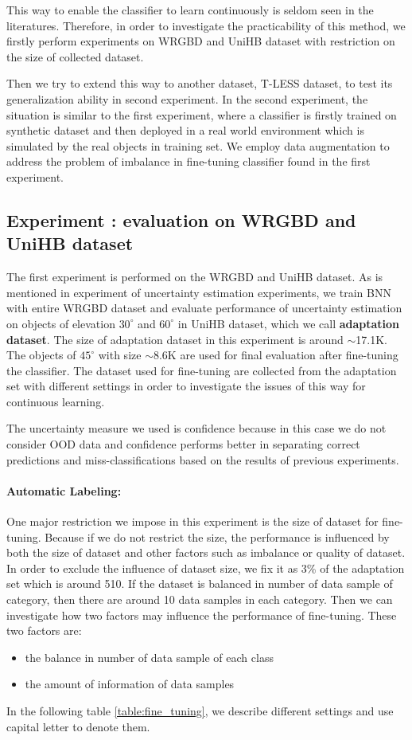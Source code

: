 This way to enable the classifier to learn continuously is seldom seen in the literatures. Therefore, in order to investigate the practicability of this method, we firstly perform experiments on WRGBD and UniHB dataset with restriction on the size of collected dataset. 

Then we try to extend this way to another dataset, T-LESS dataset, to test its generalization ability in second experiment. In the second experiment, the situation is similar to the first experiment, where a classifier is firstly trained on synthetic dataset and then deployed in a real world environment which is simulated by the real objects in training set.  We employ data augmentation to address the problem of imbalance in fine-tuning classifier found in the first experiment.
 
\subsection{Experiment : evaluation on WRGBD and UniHB dataset}
The first experiment is performed on the WRGBD and UniHB dataset. As is mentioned in experiment  of uncertainty estimation experiments, we train BNN with entire WRGBD dataset and evaluate performance of uncertainty estimation on objects of elevation $30^{\circ}$ and $60^{\circ}$ in UniHB dataset, which we call \textbf{adaptation dataset}. The size of adaptation dataset in this experiment is around $\sim$17.1K. The objects of $45^{\circ}$ with size $\sim$8.6K are used for final evaluation after fine-tuning the classifier. The dataset used for fine-tuning are collected from the adaptation set with different settings in order to investigate the issues of this way for continuous learning. 

The uncertainty measure we used is confidence because in this case we do not consider OOD data and confidence performs better in separating correct predictions and miss-classifications based on the results of previous experiments.

\paragraph{Automatic Labeling:}One major restriction we impose in this experiment is the size of dataset for fine-tuning. Because if we do not restrict the size, the performance is influenced by both the size of dataset and other factors such as imbalance or quality of dataset. In order to exclude the influence of dataset size, we fix it as 3\% of the adaptation set which is around 510. If the dataset is balanced in number of data sample of category, then there are around 10 data samples in each category. Then we can investigate how two factors may influence the performance of fine-tuning. 
These two factors are:
\begin{itemize}
	\item the balance in number of data sample of each class 
	\item the amount of information of data samples
\end{itemize}
In the following table \ref{table:fine_tuning}, we describe different settings and use capital letter to denote them.

